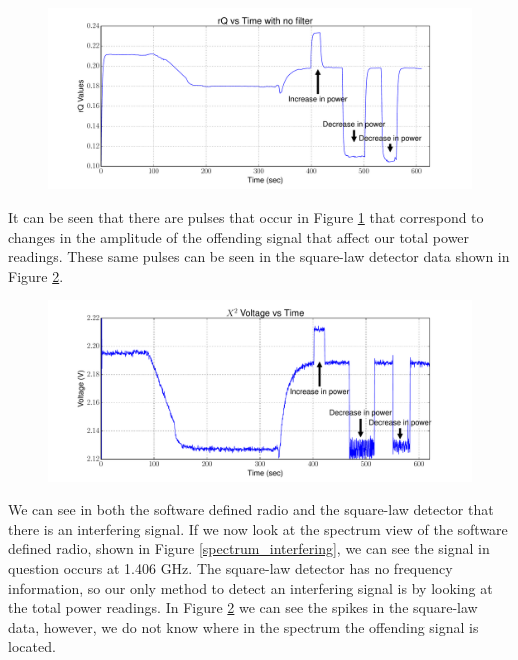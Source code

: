 \begin{figure}[h!tb] \centering
\includegraphics[width=\textwidth]{Experiments/Exp4/sdr_raw_unfiltered.pdf}
\label{sdr_unfilt_raw}
\end{figure}

It can be seen that there are pulses that occur in Figure \ref{sdr_unfilt_raw} that correspond to changes in the amplitude of the offending signal that affect our total power readings.  These same pulses can be seen in the square-law detector data shown in Figure \ref{x2_unfilt_signal}.

\begin{figure}[h!tb] \centering
\includegraphics[width=\textwidth]{Experiments/Exp4/x2_voltage.pdf}
\label{x2_unfilt_signal}
\end{figure}

We can see in both the software defined radio and the square-law detector that there is an interfering signal.  If we now look at the spectrum view of the software defined radio, shown in Figure \ref{spectrum_interfering}, we can see the signal in question occurs  at 1.406 GHz.  The square-law detector has no frequency information, so our only method to detect an interfering signal is by looking at the total power readings.  In Figure \ref{x2_unfilt_signal} we can see the spikes in the square-law data, however, we do not know where in the spectrum the offending signal is located.


